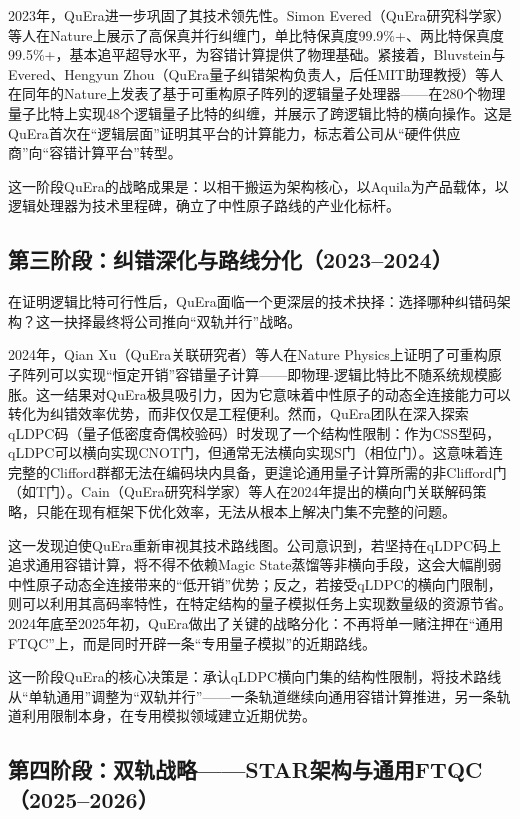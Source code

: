 \documentclass[11pt,a4paper]{ctexart}
\begin{document}
2023年，QuEra进一步巩固了其技术领先性。Simon Evered（QuEra研究科学家）等人在Nature上展示了高保真并行纠缠门，单比特保真度99.9\%+、两比特保真度99.5\%+，基本追平超导水平，为容错计算提供了物理基础。紧接着，Bluvstein与Evered、Hengyun Zhou（QuEra量子纠错架构负责人，后任MIT助理教授）等人在同年的Nature上发表了基于可重构原子阵列的逻辑量子处理器——在280个物理量子比特上实现48个逻辑量子比特的纠缠，并展示了跨逻辑比特的横向操作。这是QuEra首次在``逻辑层面''证明其平台的计算能力，标志着公司从``硬件供应商''向``容错计算平台''转型。

这一阶段QuEra的战略成果是：以相干搬运为架构核心，以Aquila为产品载体，以逻辑处理器为技术里程碑，确立了中性原子路线的产业化标杆。

\subsection{第三阶段：纠错深化与路线分化（2023--2024）}

在证明逻辑比特可行性后，QuEra面临一个更深层的技术抉择：选择哪种纠错码架构？这一抉择最终将公司推向``双轨并行''战略。

2024年，Qian Xu（QuEra关联研究者）等人在Nature Physics上证明了可重构原子阵列可以实现``恒定开销''容错量子计算——即物理-逻辑比特比不随系统规模膨胀。这一结果对QuEra极具吸引力，因为它意味着中性原子的动态全连接能力可以转化为纠错效率优势，而非仅仅是工程便利。然而，QuEra团队在深入探索qLDPC码（量子低密度奇偶校验码）时发现了一个结构性限制：作为CSS型码，qLDPC可以横向实现CNOT门，但通常无法横向实现S门（相位门）。这意味着连完整的Clifford群都无法在编码块内具备，更遑论通用量子计算所需的非Clifford门（如T门）。Cain（QuEra研究科学家）等人在2024年提出的横向门关联解码策略，只能在现有框架下优化效率，无法从根本上解决门集不完整的问题。

这一发现迫使QuEra重新审视其技术路线图。公司意识到，若坚持在qLDPC码上追求通用容错计算，将不得不依赖Magic State蒸馏等非横向手段，这会大幅削弱中性原子动态全连接带来的``低开销''优势；反之，若接受qLDPC的横向门限制，则可以利用其高码率特性，在特定结构的量子模拟任务上实现数量级的资源节省。2024年底至2025年初，QuEra做出了关键的战略分化：不再将单一赌注押在``通用FTQC''上，而是同时开辟一条``专用量子模拟''的近期路线。

这一阶段QuEra的核心决策是：承认qLDPC横向门集的结构性限制，将技术路线从``单轨通用''调整为``双轨并行''——一条轨道继续向通用容错计算推进，另一条轨道利用限制本身，在专用模拟领域建立近期优势。

\subsection{第四阶段：双轨战略——STAR架构与通用FTQC（2025--2026）}
\end{document}
